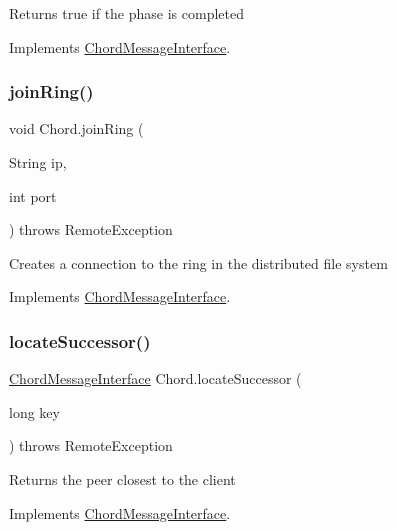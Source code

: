 Returns true if the phase is completed 

Implements \mbox{\hyperlink{interface_chord_message_interface}{Chord\+Message\+Interface}}.

\mbox{\label{class_chord_ace0b8d2768590d7527af155c6573cae7}} 
\subsubsection{\texorpdfstring{join\+Ring()}{joinRing()}}
{\footnotesize\ttfamily void Chord.\+join\+Ring (\begin{DoxyParamCaption}\item[{String}]{ip,  }\item[{int}]{port }\end{DoxyParamCaption}) throws Remote\+Exception\hspace{0.3cm}{\ttfamily [inline]}}

Creates a connection to the ring in the distributed file system 

Implements \mbox{\hyperlink{interface_chord_message_interface}{Chord\+Message\+Interface}}.

\mbox{\label{class_chord_a7e354ea388d048d4910fa28b182ebe9f}} 
\subsubsection{\texorpdfstring{locate\+Successor()}{locateSuccessor()}}
{\footnotesize\ttfamily \mbox{\hyperlink{interface_chord_message_interface}{Chord\+Message\+Interface}} Chord.\+locate\+Successor (\begin{DoxyParamCaption}\item[{long}]{key }\end{DoxyParamCaption}) throws Remote\+Exception\hspace{0.3cm}{\ttfamily [inline]}}

Returns the peer closest to the client 

Implements \mbox{\hyperlink{interface_chord_message_interface}{Chord\+Message\+Interface}}.

\mbox{\label{class_chord_a6fe57e7be47f45c0be7dfb59c23bb231}} 
